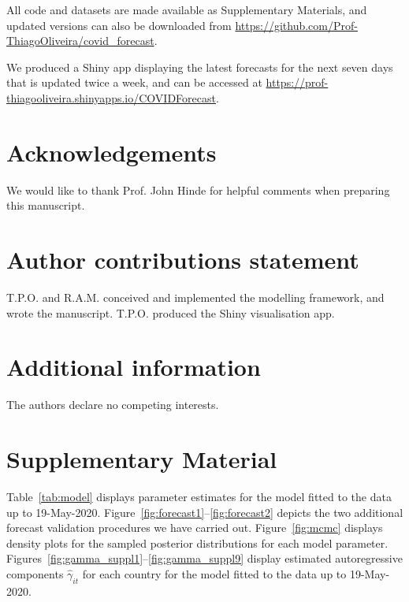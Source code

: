 \documentclass[fleqn,10pt]{wlscirep}
\begin{document}
All code and datasets are made available as Supplementary Materials, and updated versions can also be downloaded from \href{https://github.com/Prof-ThiagoOliveira/covid_forecast}{https://github.com/Prof-ThiagoOliveira/covid\_forecast}.

We produced a Shiny app displaying the latest forecasts for the next seven days that is updated twice a week, and can be accessed at \href{https://prof-thiagooliveira.shinyapps.io/COVIDForecast}{https://prof-thiagooliveira.shinyapps.io/COVIDForecast}.



\section*{Acknowledgements}

We would like to thank Prof. John Hinde for helpful comments when preparing this manuscript.

\section*{Author contributions statement}

T.P.O. and R.A.M. conceived and implemented the modelling framework, and wrote the manuscript. T.P.O. produced the Shiny visualisation app.

\section*{Additional information}

The authors declare no competing interests.

\section*{Supplementary Material}

Table~\ref{tab:model} displays parameter estimates for the model fitted to the data up to 19-May-2020. Figure~\ref{fig:forecast1}--\ref{fig:forecast2} depicts the two additional forecast validation procedures we have carried out. Figure~\ref{fig:mcmc} displays density plots for the sampled posterior distributions for each model parameter. Figures~\ref{fig:gamma_suppl1}--\ref{fig:gamma_suppl9} display estimated autoregressive components $\hat\gamma_{it}$ for each country for the model fitted to the data up to 19-May-2020. 
\end{document}
